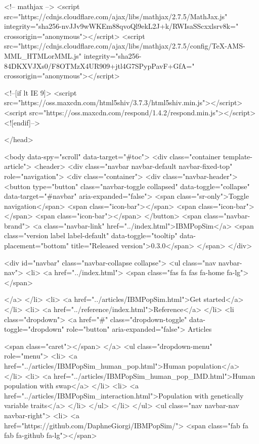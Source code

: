 <!-- mathjax -->
<script src="https://cdnjs.cloudflare.com/ajax/libs/mathjax/2.7.5/MathJax.js" integrity="sha256-nvJJv9wWKEm88qvoQl9ekL2J+k/RWIsaSScxxlsrv8k=" crossorigin="anonymous"></script>
<script src="https://cdnjs.cloudflare.com/ajax/libs/mathjax/2.7.5/config/TeX-AMS-MML_HTMLorMML.js" integrity="sha256-84DKXVJXs0/F8OTMzX4UR909+jtl4G7SPypPavF+GfA=" crossorigin="anonymous"></script>

<!--[if lt IE 9]>
<script src="https://oss.maxcdn.com/html5shiv/3.7.3/html5shiv.min.js"></script>
<script src="https://oss.maxcdn.com/respond/1.4.2/respond.min.js"></script>
<![endif]-->



  </head>

  <body data-spy="scroll" data-target="#toc">
    <div class="container template-article">
      <header>
      <div class="navbar navbar-default navbar-fixed-top" role="navigation">
  <div class="container">
    <div class="navbar-header">
      <button type="button" class="navbar-toggle collapsed" data-toggle="collapse" data-target="#navbar" aria-expanded="false">
        <span class="sr-only">Toggle navigation</span>
        <span class="icon-bar"></span>
        <span class="icon-bar"></span>
        <span class="icon-bar"></span>
      </button>
      <span class="navbar-brand">
        <a class="navbar-link" href="../index.html">IBMPopSim</a>
        <span class="version label label-default" data-toggle="tooltip" data-placement="bottom" title="Released version">0.3.0</span>
      </span>
    </div>

    <div id="navbar" class="navbar-collapse collapse">
      <ul class="nav navbar-nav">
        <li>
  <a href="../index.html">
    <span class="fas fa fas fa-home fa-lg"></span>
     
  </a>
</li>
<li>
  <a href="../articles/IBMPopSim.html">Get started</a>
</li>
<li>
  <a href="../reference/index.html">Reference</a>
</li>
<li class="dropdown">
  <a href="#" class="dropdown-toggle" data-toggle="dropdown" role="button" aria-expanded="false">
    Articles
     
    <span class="caret"></span>
  </a>
  <ul class="dropdown-menu" role="menu">
    <li>
      <a href="../articles/IBMPopSim_human_pop.html">Human population</a>
    </li>
    <li>
      <a href="../articles/IBMPopSim_human_pop_IMD.html">Human population with swap</a>
    </li>
    <li>
      <a href="../articles/IBMPopSim_interaction.html">Population with genetically variable traits</a>
    </li>
  </ul>
</li>
      </ul>
      <ul class="nav navbar-nav navbar-right">
        <li>
  <a href="https://github.com/DaphneGiorgi/IBMPopSim/">
    <span class="fab fa fab fa-github fa-lg"></span>
     
